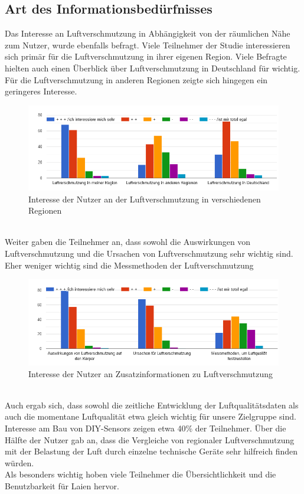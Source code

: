 \subsection{Art des Informationsbedürfnisses}
Das Interesse an Luftverschmutzung in Abhängigkeit von der räumlichen Nähe zum Nutzer, wurde ebenfalls befragt.
Viele Teilnehmer der Studie interessieren sich primär für die Luftverschmutzung in ihrer eigenen Region. Viele Befragte hielten auch einen Überblick über Luftverschmutzung in Deutschland für wichtig. Für die Luftverschmutzung in anderen Regionen zeigte sich hingegen ein geringeres Interesse.
\\
\begin{figure}[h]
    \centering
    \includegraphics[width=1\textwidth]{media/diagram/interesse.png}
    \caption{Interesse der Nutzer an der Luftverschmutzung in verschiedenen Regionen}
\end{figure}
\\
Weiter gaben die Teilnehmer an,  dass sowohl die Auswirkungen von Luftverschmutzung und die Ursachen von Luftverschmutzung sehr wichtig sind. Eher weniger wichtig sind die Messmethoden der Luftverschmutzung
\\
\begin{figure}[h]
    \centering
    \includegraphics[width=1\textwidth]{media/diagram/interesse2.png}
    \caption{Interesse der Nutzer an Zusatzinformationen zu Luftverschmutzung}
\end{figure}
\\
Auch ergab sich, dass sowohl die zeitliche Entwicklung der Luftqualitätsdaten als auch die momentane Luftqualität etwa gleich wichtig für unsere Zielgruppe sind. Interesse am Bau von \gls{DIY}-\glspl{Sensor} zeigen etwa 40\%  der Teilnehmer.
Über die Hälfte der Nutzer gab an, dass die Vergleiche von regionaler Luftverschmutzung mit der Belastung der Luft durch einzelne technische Geräte sehr hilfreich finden würden.
\\
Als besonders wichtig hoben viele Teilnehmer die Übersichtlichkeit und die Benutzbarkeit für Laien hervor.

